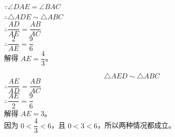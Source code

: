 \documentclass{exam-zh}
\begin{document}
\begin{eduDualExplain}
  \begin{eduExplainLeft}
  \end{eduExplainLeft}

  \begin{eduExplainRight}
$\because \angle DAE=\angle BAC$\\ 
$\therefore \triangle ADE\sim\triangle ABC $\\
$\therefore \dfrac{AD}{AE}=\dfrac{AB}{AC}$\\
$\therefore \dfrac2{AE}=\dfrac96$\\
解得 $AE=\dfrac43$。
      \begin{center}
        \begin{diagramcoltikz}{70mm}{当 $\triangle ADE\sim\triangle ABC$ 时。}
        }
        \end{diagramcoltikz}
      \end{center}
\[
\triangle AED\sim\triangle ABC
\]
$\therefore \dfrac{AE}{AD}=\dfrac{AB}{AC}$\\
$\therefore \dfrac{AE}{2}=\dfrac96$\\
解得 $AE=3$。\\
因为 $0<\dfrac43<6$，且 $0<3<6$，所以两种情况都成立。
      \begin{center}
        \begin{diagramcoltikz}{70mm}{当 $\triangle AED\sim\triangle ABC$ 时。}
        }
        \end{diagramcoltikz}
      \end{center}
  \end{eduExplainRight}
\end{eduDualExplain}
\end{document}
